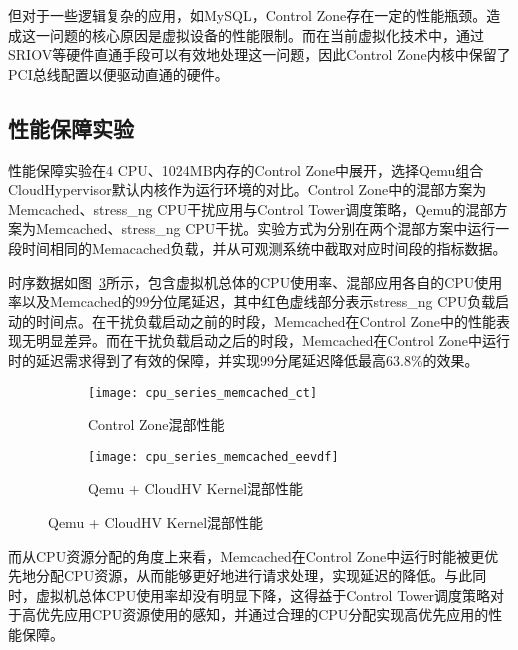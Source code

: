 但对于一些逻辑复杂的应用，如MySQL，Control Zone存在一定的性能瓶颈。造成这一问题的核心原因是虚拟设备的性能限制。而在当前虚拟化技术中，通过SRIOV等硬件直通手段可以有效地处理这一问题，因此Control Zone内核中保留了PCI总线配置以便驱动直通的硬件。

\subsection{性能保障实验}

性能保障实验在4 CPU、1024MB内存的Control Zone中展开，选择Qemu组合CloudHypervisor默认内核作为运行环境的对比。Control Zone中的混部方案为Memcached、stress\_ng CPU干扰应用与Control Tower调度策略，Qemu的混部方案为Memcached、stress\_ng CPU干扰。实验方式为分别在两个混部方案中运行一段时间相同的Memacached负载，并从可观测系统中截取对应时间段的指标数据。

时序数据如图~\ref{fig:cpu_series_memcached}所示，包含虚拟机总体的CPU使用率、混部应用各自的CPU使用率以及Memcached的99分位尾延迟，其中红色虚线部分表示stress\_ng CPU负载启动的时间点。在干扰负载启动之前的时段，Memcached在Control Zone中的性能表现无明显差异。而在干扰负载启动之后的时段，Memcached在Control Zone中运行时的延迟需求得到了有效的保障，并实现99分尾延迟降低最高63.8\%的效果。

\begin{figure}[H]
    \centering
    \begin{subfigure}[b]{0.49\textwidth}
        \texttt{[image: cpu\_series\_memcached\_ct]}
        \caption{\quad Control Zone混部性能}
        \label{fig:cpu_series_memcached_ct}
    \end{subfigure}
    \begin{subfigure}[b]{0.49\textwidth}
        \texttt{[image: cpu\_series\_memcached\_eevdf]}
        \caption{\quad Qemu + CloudHV Kernel混部性能}
        \label{fig:cpu_series_memcached_eevdf}
    \end{subfigure}
    \label{fig:cpu_series_memcached}
\end{figure}

而从CPU资源分配的角度上来看，Memcached在Control Zone中运行时能被更优先地分配CPU资源，从而能够更好地进行请求处理，实现延迟的降低。与此同时，虚拟机总体CPU使用率却没有明显下降，这得益于Control Tower调度策略对于高优先应用CPU资源使用的感知，并通过合理的CPU分配实现高优先应用的性能保障。


